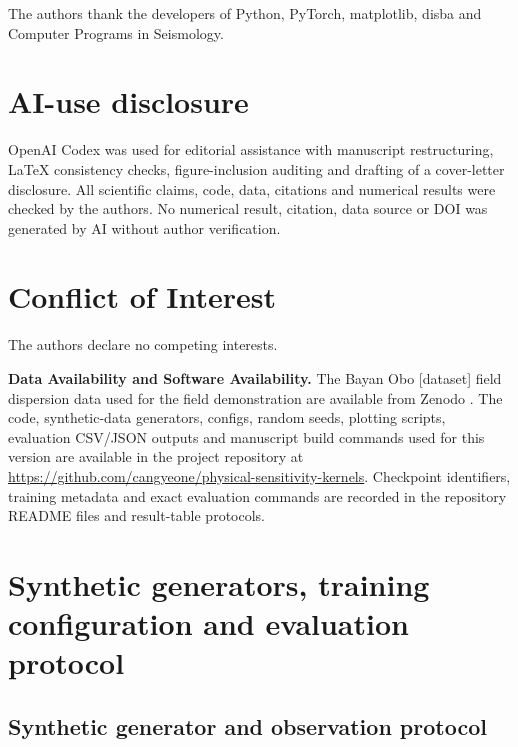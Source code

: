 \documentclass[referee]{gji}
\begin{document}
The authors thank the developers of Python, PyTorch, matplotlib, disba and Computer Programs in Seismology.

\section*{AI-use disclosure}

OpenAI Codex was used for editorial assistance with manuscript restructuring, LaTeX consistency checks, figure-inclusion auditing and drafting of a cover-letter disclosure. All scientific claims, code, data, citations and numerical results were checked by the authors. No numerical result, citation, data source or DOI was generated by AI without author verification.

\section*{Conflict of Interest}

The authors declare no competing interests.

\begin{dataavailability}
\noindent\textbf{Data Availability and Software Availability.}
The Bayan Obo [dataset] field dispersion data used for the field demonstration are available from Zenodo \citep{Yang2025BayanOboDataset}. The code, synthetic-data generators, configs, random seeds, plotting scripts, evaluation CSV/JSON outputs and manuscript build commands used for this version are available in the project repository at \url{https://github.com/cangyeone/physical-sensitivity-kernels}. Checkpoint identifiers, training metadata and exact evaluation commands are recorded in the repository README files and result-table protocols.
\end{dataavailability}

\clearpage




\appendix
\setcounter{table}{0}
\renewcommand{\thetable}{A\arabic{table}}
\renewcommand{\theHtable}{A\arabic{table}}

\section{Synthetic generators, training configuration and evaluation protocol}

\subsection{Synthetic generator and observation protocol}
\end{document}
